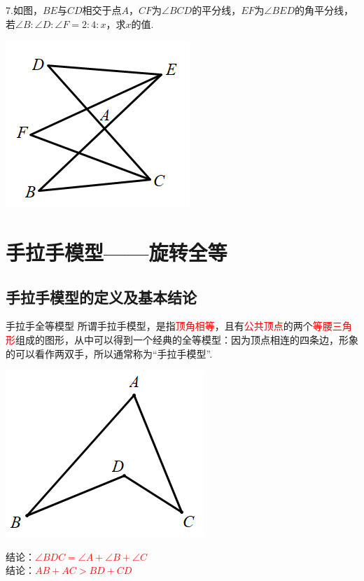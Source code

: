 \documentclass[10pt,twocolumn]{ctexart}
\begin{document}
7.如图，$BE$与$CD$相交于点$A$，$CF$为$\angle BCD$的平分线，$EF$为$\angle BED$的角平分线，若$\angle B:\angle D:\angle F=2:4:x$，求$x$的值.

 \includegraphics[scale=0.5]{figure/bazhi14.PNG}

\section{手拉手模型——旋转全等}
\subsection{手拉手模型的定义及基本结论}
\begin{custom}[explorecolor]{手拉手全等模型}
所谓手拉手模型，是指\textcolor{red}{顶角相等}，且有\textcolor{red}{公共顶点}的两个\textcolor{red}{等腰三角形}组成的图形，从中可以得到一个经典的全等模型：因为顶点相连的四条边，形象的可以看作两双手，所以通常称为“手拉手模型”.

\begin{minipage}{0.3\textwidth}
 \includegraphics[scale=0.3]{figure/feibiao01.PNG}
\end{minipage}
\begin{minipage}{0.6\textwidth}
结论：\textcolor{red}{$\angle BDC=\angle A+\angle B+\angle C$}\\
结论：\textcolor{red}{$AB+AC>BD+CD$}
\end{minipage}
\end{custom}
\end{document}
